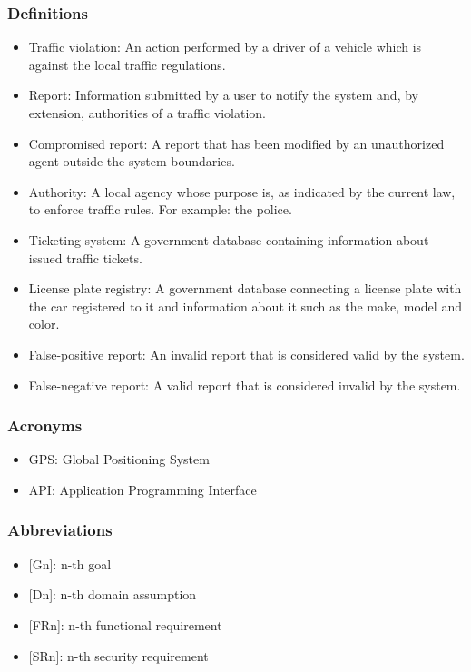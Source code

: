 \subsubsection{Definitions}
\begin{itemize}
    \item Traffic violation: An action performed by a driver of a vehicle which is against the local traffic regulations.
    \item Report: Information submitted by a user to notify the system and, by extension, authorities of a traffic violation.
    \item Compromised report: A report that has been modified by an unauthorized agent outside the system boundaries.
    \item Authority: A local agency whose purpose is, as indicated by the current law, to enforce traffic rules. For example: the police.
    \item Ticketing system: A government database containing information about issued traffic tickets.
    \item License plate registry: A government database connecting a license plate with the car registered to it and information about it such as the make, model and color.
    \item False-positive report: An invalid report that is considered valid by the system.
    \item False-negative report: A valid report that is considered invalid by the system.
\end{itemize}

\subsubsection{Acronyms}
\begin{itemize}
    \item GPS: Global Positioning System
    \item API: Application Programming Interface
\end{itemize}

\subsubsection{Abbreviations}
\begin{itemize}
    \item {[Gn]}: n-th goal
    \item {[Dn]}: n-th domain assumption 
    \item {[FRn]}: n-th functional requirement
    \item {[SRn]}: n-th security requirement
\end{itemize}

